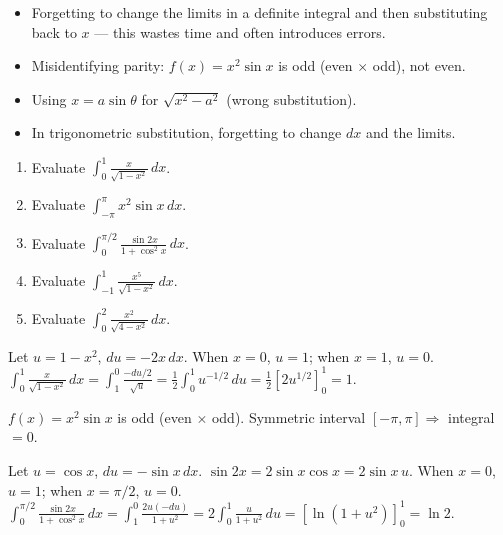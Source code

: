 \documentclass[11pt]{article}
\begin{document}
\begin{attention}
\begin{itemize}
\item Forgetting to change the limits in a definite integral and then substituting back to $x$ — this wastes time and often introduces errors.
\item Misidentifying parity: $f(x)=x^2\sin x$ is odd (even $\times$ odd), not even.
\item Using $x=a\sin\theta$ for $\sqrt{x^2-a^2}$ (wrong substitution).
\item In trigonometric substitution, forgetting to change $dx$ and the limits.
\end{itemize}
\end{attention}

\begin{exercice}[Practice]
\begin{enumerate}
\item Evaluate $\displaystyle\int_0^1 \frac{x}{\sqrt{1-x^2}}\,dx$.
\item Evaluate $\displaystyle\int_{-\pi}^{\pi} x^2\sin x\,dx$.
\item Evaluate $\displaystyle\int_0^{\pi/2} \frac{\sin 2x}{1+\cos^2 x}\,dx$.
\item Evaluate $\displaystyle\int_{-1}^{1} \frac{x^5}{\sqrt{1-x^2}}\,dx$.
\item Evaluate $\displaystyle\int_0^2 \frac{x^2}{\sqrt{4-x^2}}\,dx$.
\end{enumerate}
\end{exercice}

\begin{corrige}[Exercise 1]
Let $u=1-x^2$, $du=-2x\,dx$.  When $x=0$, $u=1$; when $x=1$, $u=0$.
$\int_0^1 \frac{x}{\sqrt{1-x^2}}\,dx = \int_1^0 \frac{-du/2}{\sqrt{u}} = \frac12\int_0^1 u^{-1/2}\,du = \frac12[2u^{1/2}]_0^1 = 1$.
\end{corrige}

\begin{corrige}[Exercise 2]
$f(x)=x^2\sin x$ is odd (even $\times$ odd).  Symmetric interval $[-\pi,\pi] \Rightarrow$ integral $= 0$.
\end{corrige}

\begin{corrige}[Exercise 3]
Let $u=\cos x$, $du=-\sin x\,dx$.  $\sin 2x = 2\sin x\cos x = 2\sin x\, u$.
When $x=0$, $u=1$; when $x=\pi/2$, $u=0$.
$\int_0^{\pi/2} \frac{\sin 2x}{1+\cos^2 x}\,dx = \int_1^0 \frac{2u(-du)}{1+u^2} = 2\int_0^1 \frac{u}{1+u^2}\,du = [\ln(1+u^2)]_0^1 = \ln 2$.
\end{corrige}
\end{document}
